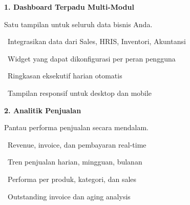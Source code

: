 \documentclass[a4paper]{article}
\begin{document}
\vspace{6pt}

\noindent
\begin{minipage}[t]{0.485\textwidth}
    \colorbox{IndigoPrimary}{%
        \begin{minipage}{\dimexpr\textwidth-2\fboxsep\relax}
            {\fontsize{10}{13}\selectfont\bfseries\color{White} 1. Dashboard Terpadu Multi-Modul}
        \end{minipage}}\par
    \vspace{4pt}
    {\fontsize{9}{12}\selectfont\color{TextDark}%
    Satu tampilan untuk seluruh data bisnis Anda.\par\vspace{3pt}
    \textbullet\ Integrasikan data dari Sales, HRIS, Inventori, Akuntansi\par\vspace{2pt}%
    \textbullet\ Widget yang dapat dikonfigurasi per peran pengguna\par\vspace{2pt}%
    \textbullet\ Ringkasan eksekutif harian otomatis\par\vspace{2pt}%
    \textbullet\ Tampilan responsif untuk desktop dan mobile}%
\end{minipage}%
\hfill
\begin{minipage}[t]{0.485\textwidth}
    \colorbox{BluePrimary}{%
        \begin{minipage}{\dimexpr\textwidth-2\fboxsep\relax}
            {\fontsize{10}{13}\selectfont\bfseries\color{White} 2. Analitik Penjualan}
        \end{minipage}}\par
    \vspace{4pt}
    {\fontsize{9}{12}\selectfont\color{TextDark}%
    Pantau performa penjualan secara mendalam.\par\vspace{3pt}
    \textbullet\ Revenue, invoice, dan pembayaran real-time\par\vspace{2pt}%
    \textbullet\ Tren penjualan harian, mingguan, bulanan\par\vspace{2pt}%
    \textbullet\ Performa per produk, kategori, dan sales\par\vspace{2pt}%
    \textbullet\ Outstanding invoice dan aging analysis}%
\end{minipage}
\end{document}
